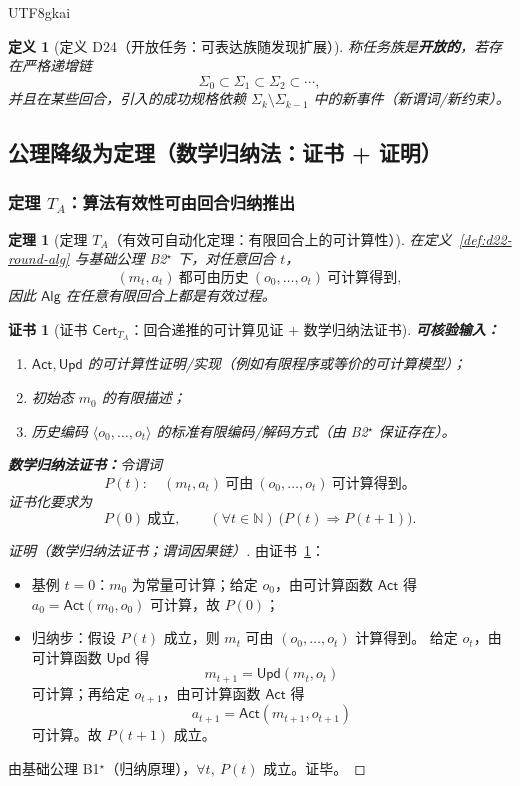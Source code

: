 \documentclass[12pt]{article}
\newtheorem{definition}{定义}[section]
\newtheorem{theorem}{定理}[section]
\newtheorem{Certificate}{证书}[section]
\newcommand{\NN}{\ensuremath{\mathbb{N}}}
\begin{document}
\begin{CJK*}{UTF8}{gkai}
\begin{definition}[定义 D24（开放任务：可表达族随发现扩展）]
\label{def:d24-open-task}
称任务族是\textbf{开放的}，若存在严格递增链
\[
  \Sigma_0\subset \Sigma_1\subset \Sigma_2\subset \cdots,
\]
并且在某些回合，引入的成功规格依赖 $\Sigma_k\setminus\Sigma_{k-1}$ 中的新事件（新谓词/新约束）。
\end{definition}

\subsection{公理降级为定理（数学归纳法：证书 + 证明）}
\label{sec:tex24-ta-tb-tc-theorems}

\subsubsection{定理 $T_A$：算法有效性可由回合归纳推出}
\label{subsec:tex24-ta}

\begin{theorem}[定理 $T_A$（有效可自动化定理：有限回合上的可计算性）]
\label{thm:tex24-ta}
在定义~\ref{def:d22-round-alg} 与基础公理 B2$^\star$ 下，对任意回合 $t$，
\[
  (m_t,a_t)\ \text{都可由历史}\ (o_0,\dots,o_t)\ \text{可计算得到},
\]
因此 $\mathsf{Alg}$ 在任意有限回合上都是有效过程。
\end{theorem}

\begin{Certificate}[证书 $\mathsf{Cert}_{T_A}$：回合递推的可计算见证 + 数学归纳法证书]
\label{cert:tex24-ta}
\textbf{可核验输入：}
\begin{enumerate}
  \item $\mathsf{Act},\mathsf{Upd}$ 的可计算性证明/实现（例如有限程序或等价的可计算模型）；
  \item 初始态 $m_0$ 的有限描述；
  \item 历史编码 $\langle o_0,\dots,o_t\rangle$ 的标准有限编码/解码方式（由 B2$^\star$ 保证存在）。
\end{enumerate}

\textbf{数学归纳法证书：}令谓词
\[
  P(t):\quad (m_t,a_t)\ \text{可由}\ (o_0,\dots,o_t)\ \text{可计算得到。}
\]
证书化要求为
\[
  P(0)\ \text{成立},\qquad
  (\forall t\in\NN)\ \bigl(P(t)\Rightarrow P(t+1)\bigr).
\]
\end{Certificate}

\begin{proof}[证明（数学归纳法证书；谓词因果链）]
由证书~\ref{cert:tex24-ta}：
\begin{itemize}
  \item 基例 $t=0$：$m_0$ 为常量可计算；给定 $o_0$，由可计算函数 $\mathsf{Act}$ 得
  $a_0=\mathsf{Act}(m_0,o_0)$ 可计算，故 $P(0)$；
  \item 归纳步：假设 $P(t)$ 成立，则 $m_t$ 可由 $(o_0,\dots,o_t)$ 计算得到。
  给定 $o_t$，由可计算函数 $\mathsf{Upd}$ 得
  \[
    m_{t+1}=\mathsf{Upd}(m_t,o_t)
  \]
  可计算；再给定 $o_{t+1}$，由可计算函数 $\mathsf{Act}$ 得
  \[
    a_{t+1}=\mathsf{Act}(m_{t+1},o_{t+1})
  \]
  可计算。故 $P(t+1)$ 成立。
\end{itemize}
由基础公理 B1$^\star$（归纳原理），$\forall t,\ P(t)$ 成立。证毕。
\end{proof}


\end{CJK*}
\end{document}
